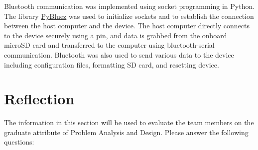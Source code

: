 \documentclass[12pt, titlepage]{article}
\begin{document}
Bluetooth communication was implemented using socket programming in Python. The library \href{https://github.com/pybluez/pybluez}{PyBluez} was used to initialize sockets and to establish the connection between the host computer and the device. The host computer directly connects to the device securely using a pin, and data is grabbed from the onboard microSD card and transferred to the computer using bluetooth-serial communication. Bluetooth was also used to send various data to the device including configuration files, formatting SD card, and resetting device.

\section{Reflection}

The information in this section will be used to evaluate the team members on the
graduate attribute of Problem Analysis and Design.  Please answer the following questions:
\end{document}
